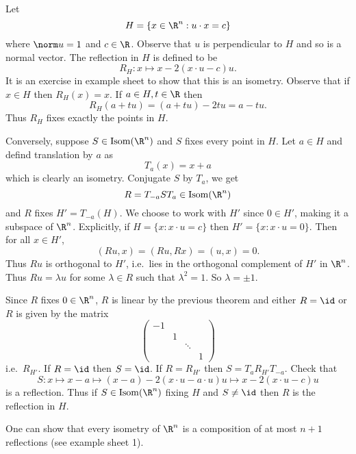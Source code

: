 \documentclass[a4paper]{article}
\theoremstyle{definition}
\DeclareMathOperator{\Isom}{Isom}
\begin{document}
\begin{eg}
  Let
  \[
    H = \{x \in \R^n: u \cdot x = c\}
  \]
  where \(\norm u = 1\) and \(c \in \R\). Observe that \(u\) is perpendicular to \(H\) and so is a normal vector. The reflection in \(H\) is defined to be
  \[
    R_H: x \mapsto x - 2(x \cdot u - c)u.
  \]
  It is an exercise in example sheet to show that this is an isometry. Observe that if \(x \in H\) then \(R_H(x) = x\). If \(a \in H, t \in \R\) then
  \[
    R_H(a + tu) = (a + tu) - 2tu = a - tu.
  \]
  Thus \(R_H\) fixes exactly the points in \(H\).

  Conversely, suppose \(S \in \Isom(\R^n)\) and \(S\) fixes every point in \(H\). Let \(a \in H\) and defind translation by \(a\) as
  \[
    T_a(x) = x + a
  \]
  which is clearly an isometry. Conjugate \(S\) by \(T_a\), we get
  \[
    R = T_{-a}ST_a \in \Isom(\R^n)
  \]
  and \(R\) fixes \(H' = T_{-a}(H)\). We choose to work with \(H'\) since \(0 \in H'\), making it a subspace of \(\R^n\). Explicitly, if \(H = \{x: x\cdot u = c\}\) then \(H' = \{x: x \cdot u = 0\}\). Then for all \(x \in H'\),
  \[
    (Ru, x) = (Ru, Rx) = (u, x) = 0.
  \]
  Thus \(Ru\) is orthogonal to \(H'\), i.e.\ lies in the orthogonal complement of \(H'\) in \(\R^n\). Thus \(Ru = \lambda u\) for some \(\lambda \in R\) such that \(\lambda^2 = 1\). So \(\lambda = \pm 1\).

  Since \(R\) fixes \(0 \in \R^n\), \(R\) is linear by the previous theorem and either \(R = \id\) or \(R\) is given by the matrix
  \[
    \begin{pmatrix}
      -1 & & \\
      & 1 & \\
      & & \ddots \\
      & & & 1
    \end{pmatrix}
  \]
  i.e.\ \(R_{H'}\). If \(R = \id\) then \(S = \id\). If \(R = R_{H'}\) then \(S = T_aR_{H'}T_{-a}\). Check that
  \[
    S: x \mapsto x - a \mapsto (x - a) - 2(x \cdot u - a \cdot u) u \mapsto x - 2(x \cdot u - c)u
  \]
  is a reflection. Thus if \(S \in \Isom(\R^n)\) fixing \(H\) and \(S \neq \id \) then \(R\) is the reflection in \(H\).
\end{eg}

\begin{remark}
  One can show that every isometry of \(\R^n\) is a composition of at most \(n + 1\) reflections (see example sheet 1).
\end{remark}
\end{document}
